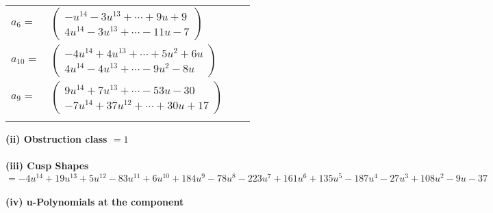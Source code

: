 \documentclass[1p]{elsarticle_modified}
\theoremstyle{definition}
\begin{document}
\begin{tabular}{m{7pt} m{180pt} m{7pt} m{180pt} }
\flushright $a_{6}=$&$\begin{pmatrix}- u^{14}-3 u^{13}+\cdots+9 u+9\\4 u^{14}-3 u^{13}+\cdots-11 u-7\end{pmatrix}$ \\
\flushright $a_{10}=$&$\begin{pmatrix}-4 u^{14}+4 u^{13}+\cdots+5 u^2+6 u\\4 u^{14}-4 u^{13}+\cdots-9 u^2-8 u\end{pmatrix}$ \\
\flushright $a_{9}=$&$\begin{pmatrix}9 u^{14}+7 u^{13}+\cdots-53 u-30\\-7 u^{14}+37 u^{12}+\cdots+30 u+17\end{pmatrix}$\\&\end{tabular}
\flushleft \textbf{(ii) Obstruction class $= 1$}\\~\\
\flushleft \textbf{(iii) Cusp Shapes $= -4 u^{14}+19 u^{13}+5 u^{12}-83 u^{11}+6 u^{10}+184 u^9-78 u^8-223 u^7+161 u^6+135 u^5-187 u^4-27 u^3+108 u^2-9 u-37$}\\~\\
\newpage\renewcommand{\arraystretch}{1}
\flushleft \textbf{(iv) u-Polynomials at the component}\newline \\
\end{document}
